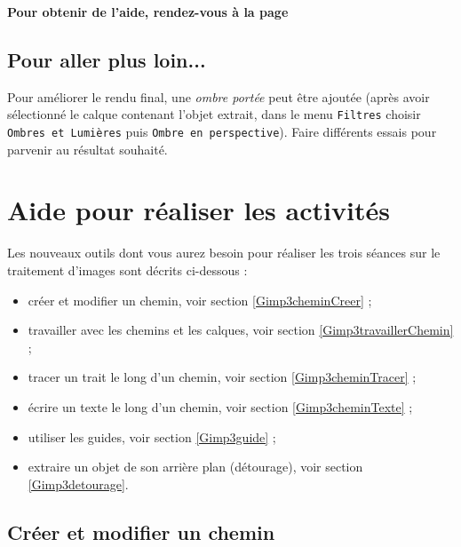\textbf{Pour obtenir de l'aide, rendez-vous à la page \pageref{Image4eOutils}}



\subsection{Pour aller plus loin...}

Pour améliorer le rendu final, une \emph{ombre portée} peut être ajoutée (après avoir sélectionné le calque contenant l'objet extrait, dans le menu \texttt{Filtres} choisir \texttt{Ombres et Lumières} puis \texttt{Ombre en perspective}). Faire différents essais pour parvenir au résultat souhaité.




\vfill







\newpage

\section{Aide pour réaliser les activités}\label{Image4eOutils}
 
Les nouveaux outils dont vous aurez besoin pour réaliser les trois séances sur le traitement d'images sont décrits ci-dessous :

\begin{itemize}
\item créer et modifier un chemin, voir section \vref{Gimp3cheminCreer} ;
\item travailler avec les chemins et les calques, voir section \vref{Gimp3travaillerChemin} ; 
\item tracer un trait le long d'un chemin, voir section \vref{Gimp3cheminTracer} ;
\item écrire un texte le long d'un chemin, voir section \vref{Gimp3cheminTexte} ;
\item utiliser les guides, voir section \vref{Gimp3guide} ;
\item extraire un objet de son arrière plan (détourage), voir section \vref{Gimp3detourage}.
\end{itemize}  


\subsection{Créer et modifier un chemin}\label{Gimp3cheminCreer} 

